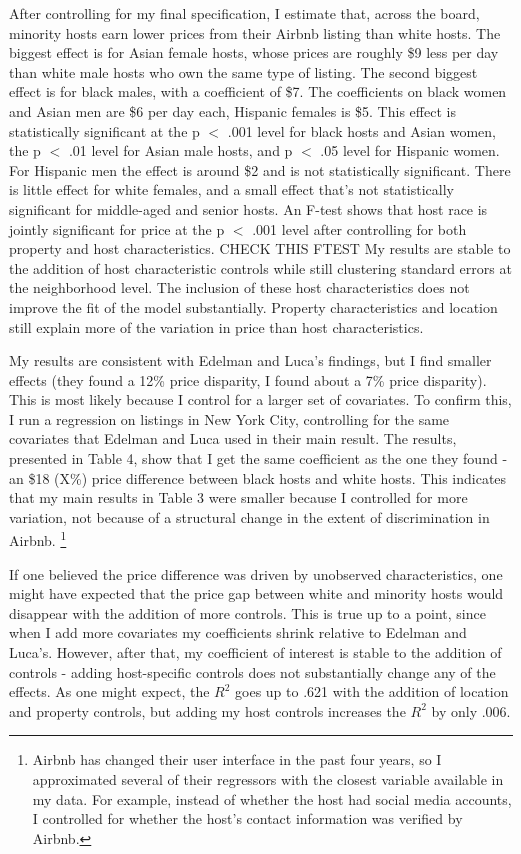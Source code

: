 After controlling for my final specification, I estimate that, across the board, minority hosts earn lower prices from their Airbnb listing than white hosts. The biggest effect is for Asian female hosts, whose prices are roughly \$9 less per day than white male hosts who own the same type of listing. The second biggest effect is for black males, with a coefficient of \$7. The coefficients on black women and Asian men are \$6 per day each, Hispanic females is \$5. This effect is statistically significant at the p $<$ .001 level for black hosts and Asian women, the p $<$ .01 level for Asian male hosts, and p $<$ .05 level for Hispanic women. For Hispanic men the effect is around \$2 and is not statistically significant. There is little effect for white females, and a small effect that's not statistically significant for middle-aged and senior hosts. An F-test shows that host race is jointly significant for price at the p $<$ .001 level after controlling for both property and host characteristics. CHECK THIS FTEST My results are stable to the addition of host characteristic controls while still clustering standard errors at the neighborhood level. The inclusion of these host characteristics does not improve the fit of the model substantially. Property characteristics and location still explain more of the variation in price than host characteristics. 

My results are consistent with Edelman and Luca's findings, but I find smaller effects (they found a 12\% price disparity, I found about a 7\% price disparity). This is most likely because I control for a larger set of covariates. To confirm this, I run a regression on listings in New York City, controlling for the same covariates that Edelman and Luca used in their main result. The results, presented in Table 4, show that I get the same coefficient as the one they found - an \$18 (X\%) price difference between black hosts and white hosts. This indicates that my main results in Table 3 were smaller because I controlled for more variation, not because of a structural change in the extent of discrimination in Airbnb.%
	\footnote{Airbnb has changed their user interface in the past four years, so I approximated several of their regressors with the closest variable available in my data. For example, instead of whether the host had social media accounts, I controlled for whether the host's contact information was verified by Airbnb.}

If one believed the price difference was driven by unobserved characteristics, one might have expected that the price gap between white and minority hosts would disappear with the addition of more controls. This is true up to a point, since when I add more covariates my coefficients shrink relative to Edelman and Luca's. However, after that, my coefficient of interest is stable to the addition of controls - adding host-specific controls does not substantially change any of the effects. As one might expect, the $R^2$ goes up to .621 with the addition of location and property controls, but adding my host controls increases the $R^2$ by only .006. 

